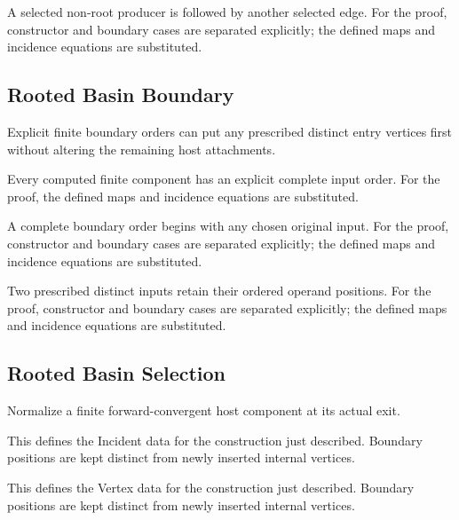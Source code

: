 A selected non-root producer is followed by another selected edge.
For the proof, constructor and boundary cases are separated explicitly; the defined maps and incidence equations are substituted.
\par{}

\subsection{Rooted Basin Boundary}
Explicit finite boundary orders can put any prescribed distinct entry vertices first without altering the remaining host attachments.

Every computed finite component has an explicit complete input order.
For the proof, the defined maps and incidence equations are substituted.
\par{}

A complete boundary order begins with any chosen original input.
For the proof, constructor and boundary cases are separated explicitly; the defined maps and incidence equations are substituted.
\par{}

Two prescribed distinct inputs retain their ordered operand positions.
For the proof, constructor and boundary cases are separated explicitly; the defined maps and incidence equations are substituted.
\par{}

\subsection{Rooted Basin Selection}
Normalize a finite forward-convergent host component at its actual exit.

This defines the Incident data for the construction just described. Boundary positions are kept distinct from newly inserted internal vertices.
\par{}

This defines the Vertex data for the construction just described. Boundary positions are kept distinct from newly inserted internal vertices.
\par{}

